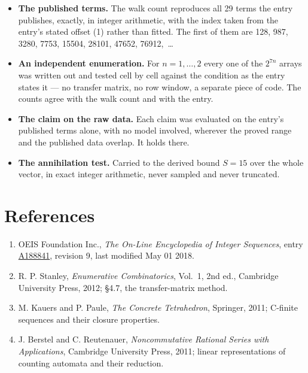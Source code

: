 \documentclass[11pt]{article}
\theoremstyle{definition}
\begin{document}
\begin{itemize}

\item {\bfseries The published terms.} The walk count reproduces all 29 terms the entry publishes, exactly, in integer arithmetic, with the index taken from the entry's stated offset (1) rather than fitted. The first of them are 128, 987, 3280, 7753, 15504, 28101, 47652, 76912,~\dots

\item {\bfseries An independent enumeration.} For $n = 1,\dots,2$ every one of the $2^{7n}$ arrays was written out and tested cell by cell against the condition as the entry states it --- no transfer matrix, no row window, a separate piece of code. The counts agree with the walk count and with the entry.

\item {\bfseries The claim on the raw data.} Each claim was evaluated on the entry's published terms alone, with no model involved, wherever the proved range and the published data overlap. It holds there.

\item {\bfseries The annihilation test.} Carried to the derived bound $S = 15$ over the whole vector, in exact integer arithmetic, never sampled and never truncated.

\end{itemize}

\section{References}

\begin{enumerate}

\item OEIS Foundation Inc., \emph{The On-Line Encyclopedia of Integer Sequences}, entry \href{https://oeis.org/A188841}{A188841}, revision 9, last modified May 01 2018.

\item R. P. Stanley, \emph{Enumerative Combinatorics}, Vol.~1, 2nd ed., Cambridge University Press, 2012; \S4.7, the transfer-matrix method.

\item M. Kauers and P. Paule, \emph{The Concrete Tetrahedron}, Springer, 2011; C-finite sequences and their closure properties.

\item J. Berstel and C. Reutenauer, \emph{Noncommutative Rational Series with Applications}, Cambridge University Press, 2011; linear representations of counting automata and their reduction.

\end{enumerate}
\end{document}
